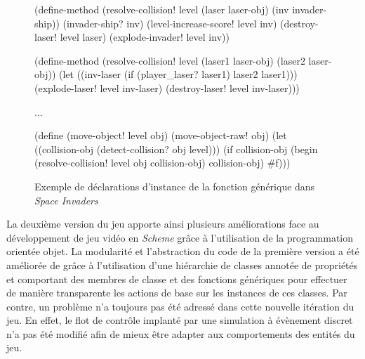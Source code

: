 \documentclass[12pt,twoside,letterpaper,francais]{book}
\newcommand{\si}{{\textit{Space Invaders }}}
\newcommand{\Schemelang}{{\textit{Scheme }}}
\newcommand{\scheme}[1]{\selectlanguage{english}{\tt #1}\selectlanguage{french}}
\begin{document}
\begin{figure}[htb!]
  \begin{schemecode}
(define-method (resolve-collision! level (laser laser-obj) 
                                         (inv invader-ship))
  (invader-ship? inv) 
  (level-increase-score! level inv)
  (destroy-laser! level laser)
  (explode-invader! level inv))

(define-method (resolve-collision! level (laser1 laser-obj)
                                         (laser2 laser-obj))
  (let ((inv-laser (if (player\_laser? laser1) laser2 laser1)))
    (explode-laser! level inv-laser)
    (destroy-laser! level inv-laser)))

...

(define (move-object! level obj)
  (move-object-raw! obj)
  (let ((collision-obj (detect-collision? obj level)))
    (if collision-obj
        (begin (resolve-collision! level obj collision-obj)
               collision-obj)
        \#f)))
  \end{schemecode}
  \caption{Exemple de déclarations d'instance de la fonction générique
    \scheme{resolve-collision!} dans \si}
  \label{Exp:si2-genfun}
\end{figure}

La deuxième version du jeu apporte ainsi plusieurs améliorations face
au développement de jeu vidéo en \Schemelang grâce à l'utilisation de
la programmation orientée objet. La modularité et l'abstraction du
code de la première version a été améliorée de grâce à l'utilisation
d'une hiérarchie de classes annotée de propriétés et comportant des
membres de classe et des fonctions génériques pour effectuer de
manière transparente les actions de base sur les instances de ces
classes. Par contre, un problème n'a toujours pas été adressé dans
cette nouvelle itération du jeu. En effet, le flot de contrôle
implanté par une simulation à évènement discret n'a pas été modifié
afin de mieux être adapter aux comportements des entités du jeu.


\FloatBarrier
\end{document}
